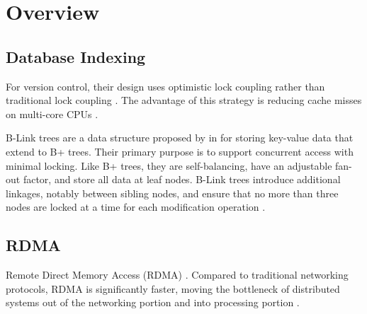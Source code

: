 \section{Overview}

\subsection{Database Indexing}



For version control, their design uses optimistic lock coupling rather than traditional lock coupling \cite{base}. The advantage of this strategy is reducing cache misses on multi-core CPUs \cite{leis-daomn-2016}.

B-Link trees are a data structure proposed by \citeauthor{b-link} in \citeyear{b-link} for storing key-value data that extend to B+ trees.
Their primary purpose is to support concurrent access with minimal locking.
Like B+ trees, they are self-balancing, have an adjustable fan-out factor, and store all data at leaf nodes.
B-Link trees introduce additional linkages, notably between sibling nodes, and ensure that no more than three nodes are locked at a time for each modification operation \cite{b-link}.


\subsection{RDMA}

Remote Direct Memory Access (RDMA) . Compared to traditional networking protocols, RDMA is significantly faster, moving the bottleneck of distributed systems out of the networking portion and into processing portion \cite{binnig-vldb-2016}.

